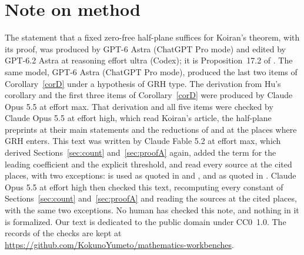 \documentclass[11pt]{amsart}
\newcommand{\recordurl}{https://github.com/KokunoYumeto/mathematics-workbenches}
\theoremstyle{definition}
\theoremstyle{remark}
\begin{document}
\section*{Note on method}
The statement that a fixed zero-free half-plane suffices for Koiran's theorem, with its proof, was produced by GPT-6 Astra (ChatGPT Pro mode) and edited by GPT-6.2 Astra at reasoning effort ultra (Codex); it is Proposition~17.2 of \cite{N}. The same model, GPT-6 Astra (ChatGPT Pro mode), produced the last two items of Corollary~\ref{corD} under a hypothesis of GRH type. The derivation from Hu's corollary and the first three items of Corollary~\ref{corD} were produced by Claude Opus 5.5 at effort max. That derivation and all five items were checked by Claude Opus 5.5 at effort high, which read Koiran's article, the half-plane preprints at their main statements and the reductions of \cite{A24} and \cite{PR25} at the places where GRH enters. This text was written by Claude Fable 5.2 at effort max, which derived Sections~\ref{sec:count} and~\ref{sec:proofA} again, added the term for the leading coefficient and the explicit threshold, and read every source at the cited places, with two exceptions: \cite{LO} is used as quoted in \cite{Roj} and \cite{OAIF}, and \cite{BHZ} as quoted in \cite{PR25}. Claude Opus 5.5 at effort high then checked this text, recomputing every constant of Sections~\ref{sec:count} and~\ref{sec:proofA} and reading the sources at the cited places, with the same two exceptions. No human has checked this note, and nothing in it is formalized. Our text is dedicated to the public domain under CC0~1.0. The records of the checks are kept at \url{\recordurl}.
\end{document}
